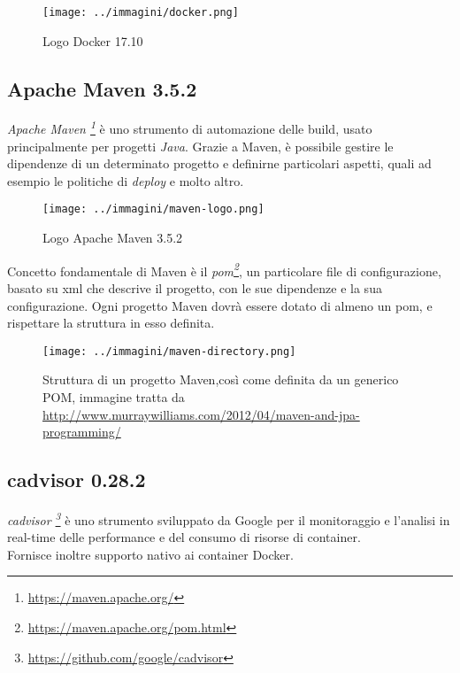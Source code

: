 \begin{figure}[H]
    \capstart
    \centering
    \texttt{[image: ../immagini/docker.png]}
    \caption{Logo Docker 17.10}
\end{figure}

\subsection{Apache Maven 3.5.2}

\textit{Apache Maven \footnote{\url{https://maven.apache.org/}}} è uno strumento di automazione delle \gls{build}, usato principalmente per progetti \textit{Java}. Grazie a Maven, è possibile gestire le dipendenze di un determinato progetto e definirne particolari aspetti, quali ad esempio le politiche di \textit{\gls{deploy}} e molto altro. \\

\begin{figure}[H]
    \capstart
    \centering
    \texttt{[image: ../immagini/maven-logo.png]}
    \caption{Logo Apache Maven 3.5.2}
\end{figure}

Concetto fondamentale di Maven è il \textit{\gls{pom}\footnote{\url{https://maven.apache.org/pom.html}}}, un particolare file di configurazione, basato su \gls{xml} che descrive il progetto, con le sue dipendenze e la sua configurazione. Ogni progetto Maven dovrà essere dotato di almeno un \gls{pom}, e rispettare la struttura in esso definita.

\begin{figure}[H]
    \capstart
    \centering
    \texttt{[image: ../immagini/maven-directory.png]}
    \caption{Struttura di un progetto Maven,così come definita da un generico POM, immagine tratta da \url{http://www.murraywilliams.com/2012/04/maven-and-jpa-programming/}}
\end{figure}

\subsection{cadvisor 0.28.2}

\textit{cadvisor \footnote{\url{https://github.com/google/cadvisor}}} è uno strumento sviluppato da Google per il monitoraggio e l'analisi in real-time delle performance e del consumo di risorse di \gls{container}. \\
Fornisce inoltre supporto nativo ai \gls{container} Docker.

